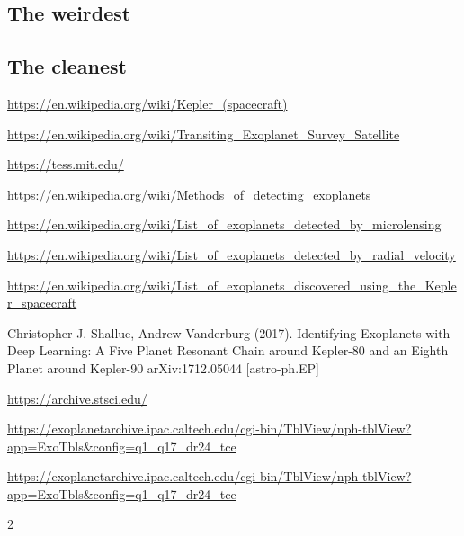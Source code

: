 \documentclass[twoside]{article}
\begin{document}
\begin{multicols}{2}
\subsection{The weirdest}

\subsection{The cleanest}



\begin{thebibliography}{99}

\url{https://en.wikipedia.org/wiki/Kepler_(spacecraft)}

\url{https://en.wikipedia.org/wiki/Transiting_Exoplanet_Survey_Satellite}

\url{https://tess.mit.edu/}

\url{https://en.wikipedia.org/wiki/Methods_of_detecting_exoplanets}

\url{https://en.wikipedia.org/wiki/List_of_exoplanets_detected_by_microlensing}

\url{https://en.wikipedia.org/wiki/List_of_exoplanets_detected_by_radial_velocity}

\url{https://en.wikipedia.org/wiki/List_of_exoplanets_discovered_using_the_Kepler_spacecraft}

Christopher J. Shallue, Andrew Vanderburg (2017).
\newblock Identifying Exoplanets with Deep Learning: A Five Planet Resonant Chain around Kepler-80 and an Eighth Planet around Kepler-90
\newblock arXiv:1712.05044 [astro-ph.EP]

\url{https://archive.stsci.edu/}

\url{https://exoplanetarchive.ipac.caltech.edu/cgi-bin/TblView/nph-tblView?app=ExoTbls&config=q1_q17_dr24_tce}

\url{https://exoplanetarchive.ipac.caltech.edu/cgi-bin/TblView/nph-tblView?app=ExoTbls&config=q1_q17_dr24_tce}
 
\end{thebibliography}


\end{multicols}{2}
\end{document}
